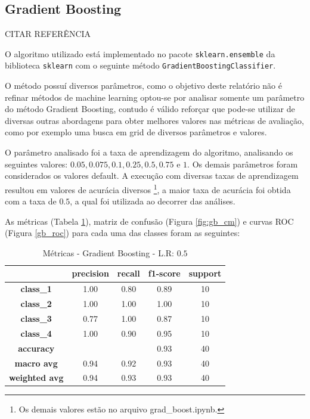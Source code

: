 \documentclass[
	article,			%
	11pt,				%
	oneside,			%
	a4paper,			%
	english,			%
	brazil,				%
	sumario=tradicional
	]{abntex2}
\begin{document}
\subsection{Gradient Boosting}

CITAR REFERÊNCIA

O algoritmo utilizado está implementado no pacote \verb|sklearn.ensemble| da biblioteca \verb|sklearn| com o seguinte método \verb|GradientBoostingClassifier|. 

O método possuí diversos parâmetros, como o objetivo deste relatório não é refinar métodos de machine learning optou-se por analisar somente um parâmetro do método Gradient Boosting, contudo é válido reforçar que pode-se utilizar de diversas outras abordagens para obter melhores valores nas métricas de avaliação, como por exemplo uma busca em grid de diversos parâmetros e valores.

O parâmetro analisado foi a taxa de aprendizagem do algoritmo, analisando os seguintes valores: $0.05, 0.075, 0.1, 0.25, 0.5, 0.75$ e $1$. Os demais parâmetros foram considerados os valores default. A execução com diversas taxas de aprendizagem resultou em valores de acurácia diversos 
\footnote{Os demais valores estão no arquivo grad\_boost.ipynb.}, a maior taxa de acurácia foi obtida com a taxa de $0.5$, a qual foi utilizada ao decorrer das análises. 


As métricas (Tabela \ref{tab:gb_01}), matriz de confusão (Figura \ref{fig:gb_cm}) e curvas ROC (Figura \ref{gb_roc}) para cada uma das classes foram as seguintes:

\begin{table}[]
\centering
\begin{tabular}{c|c|c|c|c|}
\cline{2-5}
                                            & \textbf{precision} & \textbf{recall} & \textbf{f1-score} & \textbf{support} \\ \hline
\multicolumn{1}{|c|}{\textbf{class\_1}}     & 1.00               & 0.80            & 0.89              & 10               \\ \hline
\multicolumn{1}{|c|}{\textbf{class\_2}}     & 1.00               & 1.00            & 1.00              & 10               \\ \hline
\multicolumn{1}{|c|}{\textbf{class\_3}}     & 0.77               & 1.00            & 0.87              & 10               \\ \hline
\multicolumn{1}{|c|}{\textbf{class\_4}}     & 1.00               & 0.90            & 0.95              & 10               \\ \hline
\multicolumn{1}{|c|}{\textbf{accuracy}}     &                    &                 & 0.93              & 40               \\ \hline
\multicolumn{1}{|c|}{\textbf{macro avg}}    & 0.94               & 0.92            & 0.93              & 40               \\ \hline
\multicolumn{1}{|c|}{\textbf{weighted avg}} & 0.94               & 0.93            & 0.93              & 40               \\ \hline
\end{tabular}
\caption{Métricas - Gradient Boosting - L.R: $0.5$}
\label{tab:gb_01}
\end{table}
\end{document}
